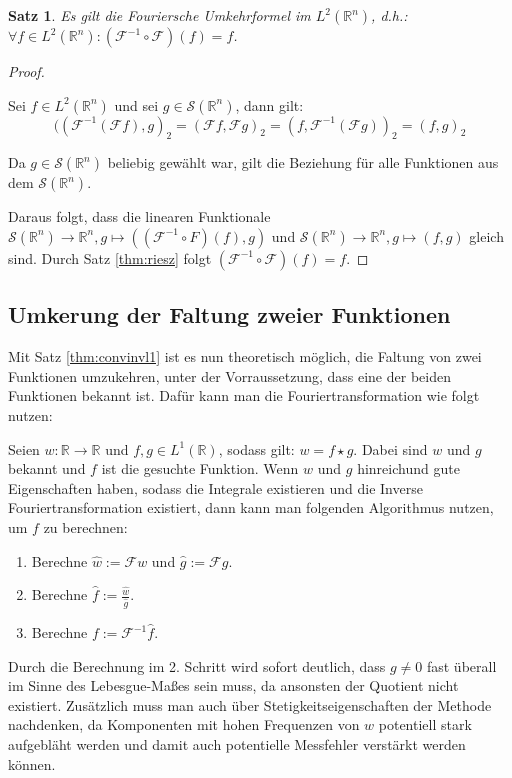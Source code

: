 \documentclass{article}
\newcommand{\R}[0]{\mathbb{R}}
\newcommand{\F}[0]{\mathcal{F}}
\newcommand{\Ssp}[0]{\mathcal{S}}
\newtheorem{thm}{Satz}
\begin{document}
\begin{thm}
    Es gilt die Fouriersche Umkehrformel im $L^2(\R^n)$, d.h.: $\forall f \in L^2(\R^n): (\F^{-1} \circ \F)(f) = f$.
\end{thm}

\begin{proof}\cite[S. 428, Theorem 24.1.2]{ebert2018methods}
    
    Sei $f \in L^2(\R^n)$ und sei $g \in \Ssp(\R^n)$, dann gilt:
    \begin{equation}
        ((\F^{-1}(\F f), g)_2 = (\F f, \F g)_2 = (f, \F^{-1}(\F g))_2 = (f, g)_2
    \end{equation}

    Da $g \in \Ssp(\R^n)$ beliebig gewählt war, gilt die Beziehung für alle Funktionen aus dem $\Ssp(\R^n)$. 
    
    Daraus folgt, dass die linearen Funktionale $\Ssp(\R^n) \to \R^n, g \mapsto ((\F^{-1} \circ F)(f), g)$ und $\Ssp(\R^n) \to \R^n, g \mapsto (f, g)$ gleich sind.
    Durch Satz \ref{thm:riesz} folgt $(\F^{-1} \circ \F)(f) = f$.
\end{proof}

\subsection{Umkerung der Faltung zweier Funktionen}

Mit Satz \ref{thm:convinvl1} ist es nun theoretisch möglich, die Faltung von zwei Funktionen umzukehren, unter der Vorraussetzung, 
dass eine der beiden Funktionen bekannt ist. Dafür kann man die Fouriertransformation wie folgt nutzen:

Seien $w: \R \to \R$ und $f, g \in L^1(\R)$, sodass gilt: $w = f \star g$. Dabei sind $w$ und $g$ bekannt und $f$ ist die gesuchte Funktion.
Wenn $w$ und $g$ hinreichund gute Eigenschaften haben, sodass die Integrale existieren und die Inverse Fouriertransformation existiert, dann kann
man folgenden Algorithmus nutzen, um $f$ zu berechnen:
\begin{enumerate}
    \item Berechne $\hat{w} := \mathcal{F}w$ und $\hat{g} := \mathcal{F}g$.
    \item Berechne $\hat{f} := \frac{\hat{w}}{\hat{g}}$.
    \item Berechne $f := \mathcal{F}^{-1}\hat{f}$.
\end{enumerate}

Durch die Berechnung im 2. Schritt wird sofort deutlich, dass $g \neq 0$ fast überall im Sinne des Lebesgue-Maßes sein muss,
da ansonsten der Quotient nicht existiert. Zusätzlich muss man auch über Stetigkeitseigenschaften der Methode nachdenken,
da Komponenten mit hohen Frequenzen von $w$ potentiell stark aufgebläht werden 
und damit auch potentielle Messfehler verstärkt werden können.
\end{document}
